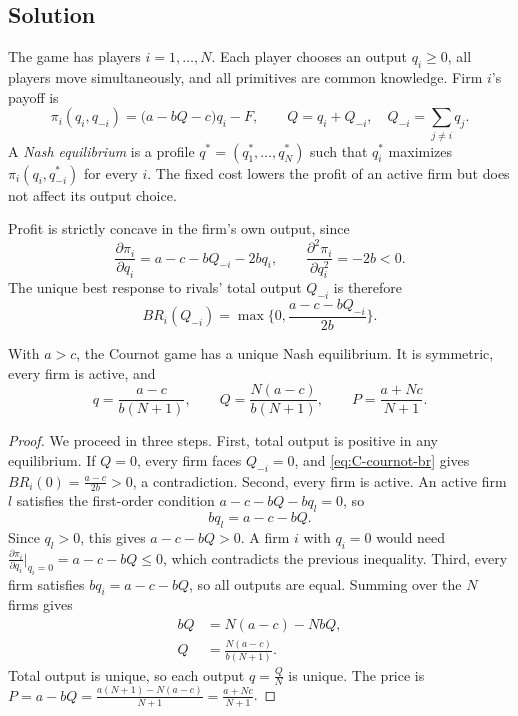 \subsection{Solution}\label{sec:C-cournot-solution}

The game has players $i = 1, \dots, N$. Each player chooses an output $q_i \ge 0$, all players move
simultaneously, and all primitives are common knowledge. Firm $i$'s payoff is
\begin{equation}\label{eq:C-cournot-profit}
\pi_i(q_i, q_{-i}) = \big(a - bQ - c\big)q_i - F, \qquad Q = q_i + Q_{-i}, \quad Q_{-i} = \sum_{j \ne i} q_j .
\end{equation}
A \emph{Nash equilibrium} is a profile $q^* = (q_1^*, \dots, q_N^*)$ such that $q_i^*$ maximizes
$\pi_i(q_i, q_{-i}^*)$ for every $i$. The fixed cost lowers the profit of an active firm but does not affect
its output choice.

Profit is strictly concave in the firm's own output, since
\begin{equation*}
\frac{\partial \pi_i}{\partial q_i} = a - c - bQ_{-i} - 2bq_i, \qquad
\frac{\partial^2 \pi_i}{\partial q_i^2} = -2b < 0 .
\end{equation*}
The unique best response to rivals' total output $Q_{-i}$ is therefore
\begin{equation}\label{eq:C-cournot-br}
BR_i(Q_{-i}) = \max\Big\{0, \frac{a - c - bQ_{-i}}{2b}\Big\}.
\end{equation}

\begin{proposition}\label{prop:C-cournot}
With $a > c$, the Cournot game has a unique Nash equilibrium. It is symmetric, every firm is active, and
\begin{equation}\label{eq:C-cournot-q}
q = \frac{a - c}{b(N + 1)}, \qquad Q = \frac{N(a - c)}{b(N + 1)}, \qquad P = \frac{a + Nc}{N + 1}.
\end{equation}
\end{proposition}

\begin{proof}
We proceed in three steps. First, total output is positive in any equilibrium. If $Q = 0$, every firm faces
$Q_{-i} = 0$, and \eqref{eq:C-cournot-br} gives $BR_i(0) = \frac{a - c}{2b} > 0$, a contradiction. Second,
every firm is active. An active firm $l$ satisfies the first-order condition $a - c - bQ - bq_l = 0$, so
\begin{equation*}
bq_l = a - c - bQ .
\end{equation*}
Since $q_l > 0$, this gives $a - c - bQ > 0$. A firm $i$ with $q_i = 0$ would need
$\frac{\partial \pi_i}{\partial q_i}\big|_{q_i = 0} = a - c - bQ \le 0$, which contradicts the previous
inequality. Third, every firm satisfies $bq_i = a - c - bQ$, so all outputs are equal. Summing over the $N$
firms gives
\begin{align*}
bQ &= N(a - c) - NbQ, \\
Q &= \frac{N(a - c)}{b(N + 1)} .
\end{align*}
Total output is unique, so each output $q = \frac{Q}{N}$ is unique. The price is
$P = a - bQ = \frac{a(N + 1) - N(a - c)}{N + 1} = \frac{a + Nc}{N + 1}$.
\end{proof}

